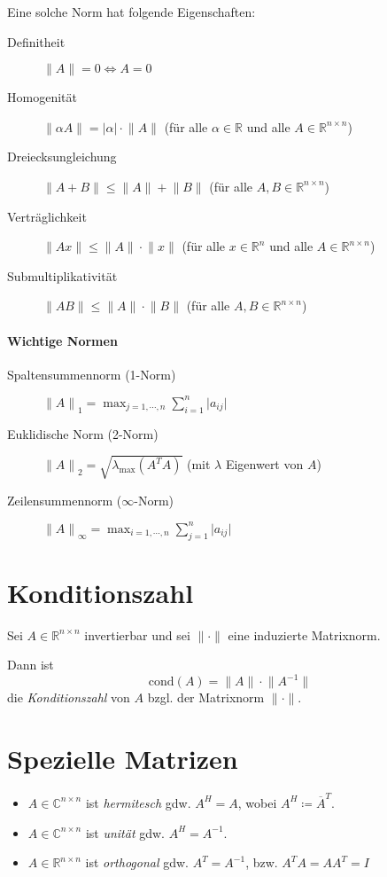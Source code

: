 \documentclass[a4paper, 11pt, accentcolor = tud3b]{tudreport}
\newcommand{\abs}[1]{\ensuremath{{\lvert #1 \rvert}}}
\newcommand{\norm}[1]{\ensuremath{\lVert #1 \rVert}}
\newcommand{\C}{\ensuremath{\mathbb{C}}}
\newcommand{\R}{\ensuremath{\mathbb{R}}}
\newcommand{\cond}{\ensuremath{\textrm{cond}}}
\begin{document}
	        Eine solche Norm hat folgende Eigenschaften:
	        \begin{description}
	        	\item[Definitheit] \( \norm{A} = 0 \iff A = 0 \)
	        	\item[Homogenität] \( \norm{\alpha A} = \abs{\alpha} \cdot \norm{A} \) (für alle \( \alpha \in \R \) und alle \( A \in \R^{n \times n} \))
	        	\item[Dreiecksungleichung] \( \norm{A + B} \leq \norm{A} + \norm{B} \) (für alle \( A, B \in \R^{n \times n} \))
	        	\item[Verträglichkeit] \( \norm{Ax} \leq \norm{A} \cdot \norm{x} \) (für alle \( x \in \R^n \) und alle \( A \in \R^{n \times n} \))
	        	\item[Submultiplikativität] \( \norm{AB} \leq \norm{A} \cdot \norm{B} \) (für alle \( A, B \in \R^{n \times n} \))
	        \end{description}
	    
		    \paragraph{Wichtige Normen}
			    \begin{description}
			    	\item[Spaltensummennorm (1-Norm)] \( \norm{A}_1 = \max_{j = 1, \cdots, n} \sum_{i = 1}^n \abs{a_{ij}} \)
			    	\item[Euklidische Norm (2-Norm)] \( \norm{A}_2 = \sqrt{\lambda _ \textrm{max} (A^T A)} \) (mit \(\lambda\) Eigenwert von \( A \))
			    	\item[Zeilensummennorm (\(\infty\)-Norm)] \( \norm{A}_\infty = \max_{i = 1, \cdots, n} \sum_{j = 1}^n \abs{a_{ij}} \)
			    \end{description}
	
	    \section{Konditionszahl}
	        Sei \( A \in \R^{n \times n} \) invertierbar und sei \( \norm{\cdot} \) eine induzierte Matrixnorm.
	        
	        Dann ist \[ \cond(A) = \norm{A} \cdot \norm{A^{-1}} \] die \textit{Konditionszahl} von \(A\) bzgl. der Matrixnorm \( \norm{\cdot} \).
	
	    \section{Spezielle Matrizen}
		    \begin{itemize}
		        \item \(A \in \C^{n \times n}\) ist \textit{hermitesch} gdw. \( A^H = A \), wobei \( A^H \coloneqq \overline{A}^T \).
		        \item \(A \in \C^{n \times n}\) ist \textit{unität} gdw. \( A^H = A^{-1} \).
		        \item \(A \in \R^{n \times n}\) ist \textit{orthogonal} gdw. \( A^T = A^{-1} \), bzw. \( A^TA = AA^T = I \)
		    \end{itemize}
	
\end{document}
